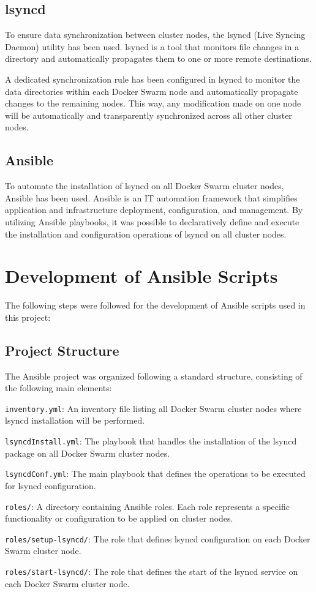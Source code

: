 \documentclass[a4paper, 12pt]{article}
\newenvironment{packed_itemize}{
\begin{itemize}
        \setlength{\itemsep}{1pt}
        \setlength{\parskip}{0pt}
        \setlength{\parsep}{0pt}
}{\end{itemize}}
\begin{document}
\subsection{lsyncd}
To ensure data synchronization between cluster nodes, the lsyncd (Live Syncing Daemon) 
utility has been used. lsyncd is a tool that monitors file changes in a directory and 
automatically propagates them to one or more remote destinations.

A dedicated synchronization rule has been configured in lsyncd to monitor the data 
directories within each Docker Swarm node and automatically propagate changes to the 
remaining nodes. This way, any modification made on one node will be automatically 
and transparently synchronized across all other cluster nodes.

\subsection{Ansible}
To automate the installation of lsyncd on all Docker Swarm cluster nodes, 
Ansible has been used. Ansible is an IT automation framework that simplifies 
application and infrastructure deployment, configuration, and management. 
By utilizing Ansible playbooks, it was possible to declaratively define and execute 
the installation and configuration operations of lsyncd on all cluster nodes.

\newpage
\section{Development of Ansible Scripts}
The following steps were followed for the development of Ansible scripts used in this project:

\subsection{Project Structure}
The Ansible project was organized following a standard structure, consisting of the following main
elements:
\begin{packed_itemize}
  \item \texttt{inventory.yml}: An inventory file listing all Docker Swarm 
    cluster nodes where lsyncd installation will be performed.
  \item \texttt{lsyncdInstall.yml}: The playbook that handles the installation 
    of the lsyncd package on all Docker Swarm cluster nodes.
  \item \texttt{lsyncdConf.yml}: The main playbook that defines the operations 
    to be executed for lsyncd configuration.
  \item \texttt{roles/}: A directory containing Ansible roles. 
    Each role represents a specific functionality or configuration to be applied on cluster nodes.
  \item \texttt{roles/setup-lsyncd/}: The role that defines lsyncd configuration 
    on each Docker Swarm cluster node.
  \item \texttt{roles/start-lsyncd/}: The role that defines the start of the lsyncd 
    service on each Docker Swarm cluster node.
\end{packed_itemize}
\end{document}
